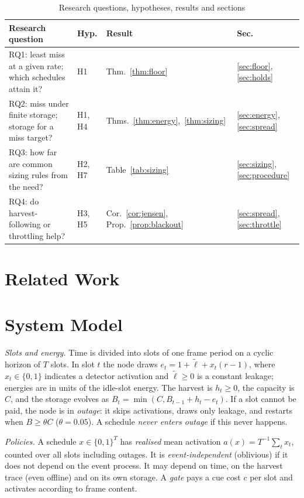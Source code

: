 \documentclass[lettersize,journal]{IEEEtran}
\theoremstyle{definition}
\theoremstyle{remark}
\newcommand{\lt}{\tilde{\ell}}
\begin{document}
\begin{table}[!t]\centering
\caption{Research questions, hypotheses, results and sections}\label{tab:rq}
\footnotesize\setlength{\tabcolsep}{3pt}
\begin{tabular}{@{}p{}lll@{}}\toprule
Research question & Hyp. & Result & Sec.\\\midrule
RQ1: least miss at a given rate; which schedules attain it? & H1 & Thm.~\ref{thm:floor} & \ref{sec:floor}, \ref{sec:holds}\\
RQ2: miss under finite storage; storage for a miss target? & H1, H4 & Thms.~\ref{thm:energy},~\ref{thm:sizing} & \ref{sec:energy}, \ref{sec:spread}\\
RQ3: how far are common sizing rules from the need? & H2, H7 & Table~\ref{tab:sizing} & \ref{sec:sizing}, \ref{sec:procedure}\\
RQ4: do harvest-following or throttling help? & H3, H5 & Cor.~\ref{cor:jensen}, Prop.~\ref{prop:blackout} & \ref{sec:spread}, \ref{sec:throttle}\\\bottomrule
\end{tabular}
\end{table}

\section{Related Work}\label{sec:related}


\section{System Model}\label{sec:model}
\emph{Slots and energy.} Time is divided into slots of one frame period on a cyclic horizon of $T$ slots. In slot $t$ the node draws $e_t=1+\lt+x_t(r-1)$, where $x_t\in\{0,1\}$ indicates a detector activation and $\lt\ge0$ is a constant leakage; energies are in units of the idle-slot energy. The harvest is $h_t\ge0$, the capacity is $C$, and the storage evolves as $B_t=\min(C,B_{t-1}+h_t-e_t)$. If a slot cannot be paid, the node is in \emph{outage}: it skips activations, draws only leakage, and restarts when $B\ge\theta C$ ($\theta=0.05$). A schedule \emph{never enters outage} if this never happens.

\emph{Policies.} A schedule $x\in\{0,1\}^T$ has \emph{realised} mean activation $a(x)=T^{-1}\sum_tx_t$, counted over all slots including outages. It is \emph{event-independent} (oblivious) if it does not depend on the event process. It may depend on time, on the harvest trace (even offline) and on its own storage. A \emph{gate} pays a cue cost $c$ per slot and activates according to frame content.
\end{document}
